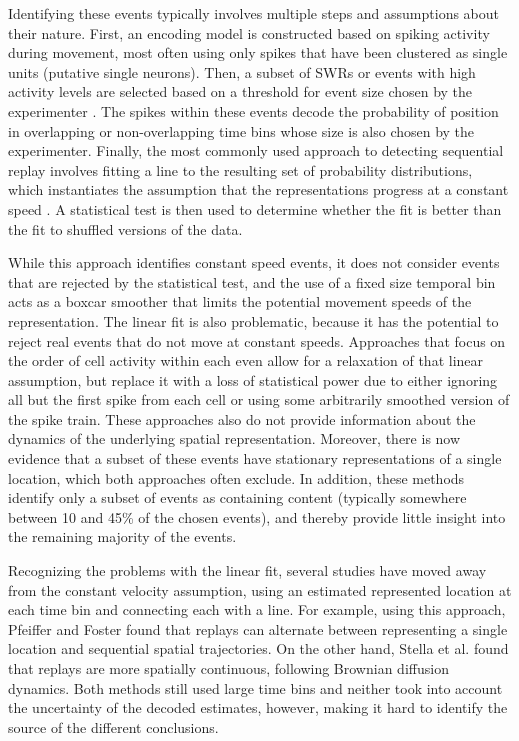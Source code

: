 \documentclass[times, twoside]{zHenriquesLab-StyleBioRxiv}
\begin{document}
Identifying these events typically involves multiple steps and assumptions about their nature. First, an encoding model is constructed based on spiking activity during movement, most often using only spikes that have been clustered as single units (putative single neurons). Then, a subset of SWRs or events with high activity levels are selected based on a threshold for event size chosen by the experimenter \cite{FosterReversereplaybehavioural2006, DibaForwardreversehippocampal2007, KarlssonAwakereplayremote2009, StellaHippocampalReactivationRandom2019}. The spikes within these events decode the probability of position in overlapping or non-overlapping time bins whose size is also chosen by the experimenter. Finally, the most commonly used approach to detecting sequential replay involves fitting a line to the resulting set of probability distributions, which instantiates the assumption that the representations progress at a constant speed \cite{FosterReversereplaybehavioural2006, DibaForwardreversehippocampal2007, KarlssonAwakereplayremote2009}. A statistical test is then used to determine whether the fit is better than the fit to shuffled versions of the data.

While this approach identifies constant speed events, it does not consider events that are rejected by the statistical test, and the use of a fixed size temporal bin acts as a boxcar smoother that limits the potential movement speeds of the representation. The linear fit is also problematic, because it has the potential to reject real events that do not move at constant speeds. Approaches that focus on the order of cell activity within each even \cite{LeeMemorySequentialExperience2002, GuptaHippocampalReplayNot2010} allow for a relaxation of that linear assumption, but replace it with a loss of statistical power due to either ignoring all but the first spike from each cell or using some arbitrarily smoothed version of the spike train. These approaches also do not provide information about the dynamics of the underlying spatial representation. Moreover, there is now evidence that a subset of these events have stationary representations of a single location, which both approaches often exclude. In addition, these methods identify only a subset of events as containing content (typically somewhere between 10 and 45\% of the chosen events), and thereby provide little insight into the remaining majority of the events.

Recognizing the problems with the linear fit, several studies have moved away from the constant velocity assumption, using an estimated represented location at each time bin and connecting each with a line. For example, using this approach, Pfeiffer and Foster \cite{PfeifferAutoassociativedynamicsgeneration2015} found that replays can alternate between representing a single location and sequential spatial trajectories. On the other hand, Stella et al. \cite{StellaHippocampalReactivationRandom2019} found that replays are more spatially continuous, following Brownian diffusion dynamics. Both methods still used large time bins and neither took into account the uncertainty of the decoded estimates, however, making it hard to identify the source of the different conclusions.
\end{document}
